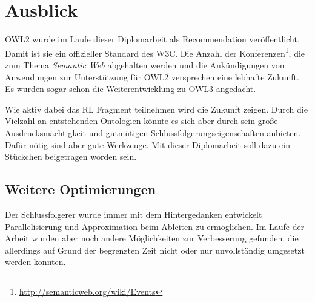 \chapter{Ausblick}
\label{kapitel-ausblick}
OWL2 wurde im Laufe dieser Diplomarbeit als Recommendation veröffentlicht. Damit ist sie ein offizieller Standard des W3C. Die Anzahl der Konferenzen\footnote{\url{http://semanticweb.org/wiki/Events}}, die zum Thema \emph{Semantic Web} abgehalten werden und die Ankündigungen von Anwendungen zur Unterstützung für OWL2 versprechen eine lebhafte Zukunft. Es wurden sogar schon die Weiterentwicklung zu OWL3 \cite{Hitzler2009} angedacht.

Wie aktiv dabei das RL Fragment teilnehmen wird die Zukunft zeigen. Durch die Vielzahl an entstehenden Ontologien könnte es sich aber durch sein große Ausdrucksmächtigkeit und gutmütigen Schlussfolgerungseigenschaften anbieten. Dafür nötig sind aber gute Werkzeuge. Mit dieser Diplomarbeit soll dazu ein Stückchen beigetragen worden sein.

\section{Weitere Optimierungen}
\label{abschnitt-weitere-optimierungen}
Der Schlussfolgerer wurde immer mit dem  Hintergedanken entwickelt Parallelisierung und Approximation beim Ableiten zu ermöglichen. Im Laufe der Arbeit wurden aber noch andere Möglichkeiten zur Verbesserung gefunden, die allerdings auf Grund der begrenzten Zeit nicht oder nur unvollständig umgesetzt werden konnten.

